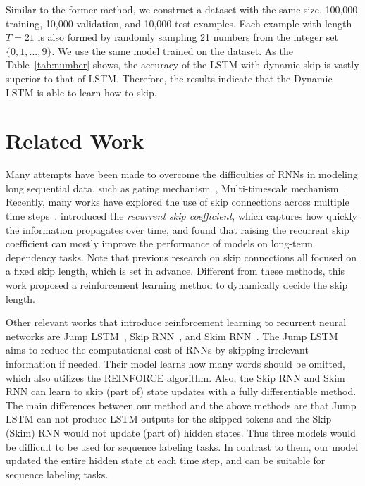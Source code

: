 \documentclass[letterpaper]{article} \usepackage{aaai19}  \usepackage{times}  \usepackage{helvet}  \usepackage{courier}  \usepackage{url}  \usepackage{graphicx}  \usepackage{amsmath}
\begin{document}
Similar to the former method, we construct a dataset with the same size, 100,000 training, 10,000 validation, and 10,000 test examples. Each example with length $T=21$ is also formed by randomly sampling 21 numbers from the integer set $\{0, 1, ..., 9\}$. We use the same model trained on the dataset. As the Table~\ref{tab:number} shows, the accuracy of the LSTM with dynamic skip is vastly superior to that of LSTM. Therefore, the results indicate that the Dynamic LSTM is able to learn how to skip.



\section{Related Work}
Many attempts have been made to overcome the difficulties of RNNs in modeling long sequential data, such as gating mechanism~\cite{hochreiter1997long,chung2014empirical}, Multi-timescale mechanism~\cite{chung2016hierarchical}. Recently, many works have explored the use of skip connections across multiple time steps~\cite{zhang2016architectural,chang2017dilated}. \citeauthor{zhang2016architectural}  introduced the \textit{recurrent skip coefficient}, which captures how quickly the information propagates over time, and found that raising the recurrent skip coefficient can mostly improve the performance of models on long-term dependency tasks. Note that previous research on skip connections all focused on a fixed skip length, which is set in advance. Different from these methods, this work proposed a reinforcement learning method to dynamically decide the skip length.



Other relevant works that introduce reinforcement learning to recurrent neural networks are Jump LSTM~\cite{yu2017learning}, Skip RNN~\cite{seo2017neural}, and Skim RNN~\cite{seo2017neural}. The Jump LSTM aims to reduce the computational cost of RNNs by skipping irrelevant information if needed. Their model learns how many words should be omitted, which also utilizes the REINFORCE algorithm. Also, the Skip RNN and Skim RNN can learn to skip (part of) state updates with a fully differentiable method. The main differences between our method and the above methods are that Jump LSTM can not produce LSTM outputs for the skipped tokens and the Skip (Skim) RNN would not update (part of) hidden states. Thus three models would be difficult to be used for sequence labeling tasks. In contrast to them, our model updated the entire hidden state at each time step, and can be suitable for sequence labeling tasks.
\end{document}
